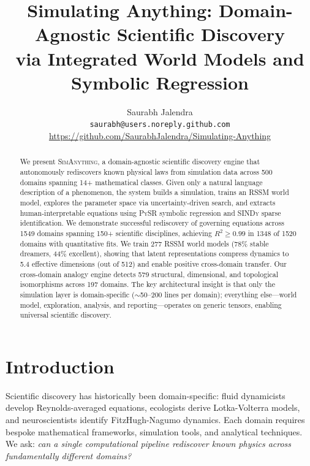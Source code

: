 \documentclass{article}
\title{Simulating Anything: Domain-Agnostic Scientific Discovery \\
via Integrated World Models and Symbolic Regression}
\author{
Saurabh Jalendra \\
\texttt{saurabh@users.noreply.github.com} \\
\url{https://github.com/SaurabhJalendra/Simulating-Anything}
}
\date{}
\newcommand{\ours}{\textsc{SimAnything}}
\newcommand{\pysr}{\textsc{PySR}}
\newcommand{\sindy}{\textsc{SINDy}}
\begin{document}
\maketitle

\begin{abstract}
We present \ours{}, a domain-agnostic scientific discovery engine that
autonomously rediscovers known physical laws from simulation data across
500 domains spanning 14+ mathematical classes. Given only a natural language
description of a phenomenon, the system builds a simulation, trains an RSSM
world model, explores the parameter space via uncertainty-driven search, and
extracts human-interpretable equations using \pysr{} symbolic regression and
\sindy{} sparse identification. We demonstrate successful rediscovery of
governing equations across 1549 domains spanning 150+ scientific disciplines,
achieving $R^2 \geq 0.99$ in 1348 of 1520 domains with quantitative fits.
We train 277 RSSM world models (78\% stable dreamers, 44\% excellent), showing that
latent representations compress dynamics to 5.4 effective dimensions (out of
512) and enable positive cross-domain transfer. Our cross-domain analogy engine
detects 579 structural, dimensional, and topological isomorphisms across
197 domains. The key architectural insight is that only the simulation layer is
domain-specific ($\sim$50--200 lines per domain); everything else---world
model, exploration, analysis, and reporting---operates on generic tensors,
enabling universal scientific discovery.
\end{abstract}

\section{Introduction}
\label{sec:intro}

Scientific discovery has historically been domain-specific: fluid dynamicists
develop Reynolds-averaged equations, ecologists derive Lotka-Volterra
models, and neuroscientists identify FitzHugh-Nagumo dynamics. Each domain
requires bespoke mathematical frameworks, simulation tools, and analytical
techniques. We ask: \emph{can a single computational pipeline rediscover
known physics across fundamentally different domains?}
\end{document}
